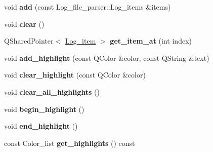 \begin{DoxyCompactItemize}
\item 
\hypertarget{class_log__viewer_1_1_log__items__model_a2065c7f09cf2f34bc476c9d549d4d8ba}{void {\bfseries add} (const Log\-\_\-file\-\_\-parser\-::\-Log\-\_\-items \&items)}\label{class_log__viewer_1_1_log__items__model_a2065c7f09cf2f34bc476c9d549d4d8ba}

\item 
\hypertarget{class_log__viewer_1_1_log__items__model_af90dd226e157a6629d669b0d381df5b3}{void {\bfseries clear} ()}\label{class_log__viewer_1_1_log__items__model_af90dd226e157a6629d669b0d381df5b3}

\item 
\hypertarget{class_log__viewer_1_1_log__items__model_a19c2785185c97acf5d2d94e7884656b2}{Q\-Shared\-Pointer$<$ \hyperlink{class_log__viewer_1_1_log__item}{Log\-\_\-item} $>$ {\bfseries get\-\_\-item\-\_\-at} (int index)}\label{class_log__viewer_1_1_log__items__model_a19c2785185c97acf5d2d94e7884656b2}

\item 
\hypertarget{class_log__viewer_1_1_log__items__model_ab94931c3cae966d04415071da272cfb7}{void {\bfseries add\-\_\-highlight} (const Q\-Color \&color, const Q\-String \&text)}\label{class_log__viewer_1_1_log__items__model_ab94931c3cae966d04415071da272cfb7}

\item 
\hypertarget{class_log__viewer_1_1_log__items__model_a5bfe5f0d114e990b1139102860162379}{void {\bfseries clear\-\_\-highlight} (const Q\-Color \&color)}\label{class_log__viewer_1_1_log__items__model_a5bfe5f0d114e990b1139102860162379}

\item 
\hypertarget{class_log__viewer_1_1_log__items__model_ab79792cd16b66ef42b644b0660c94e3e}{void {\bfseries clear\-\_\-all\-\_\-highlights} ()}\label{class_log__viewer_1_1_log__items__model_ab79792cd16b66ef42b644b0660c94e3e}

\item 
\hypertarget{class_log__viewer_1_1_log__items__model_ac4abf3f20d17ade1eec7b63b5b38ae38}{void {\bfseries begin\-\_\-highlight} ()}\label{class_log__viewer_1_1_log__items__model_ac4abf3f20d17ade1eec7b63b5b38ae38}

\item 
\hypertarget{class_log__viewer_1_1_log__items__model_a175e6ed971ea20ae342d1c53cdfed7e6}{void {\bfseries end\-\_\-highlight} ()}\label{class_log__viewer_1_1_log__items__model_a175e6ed971ea20ae342d1c53cdfed7e6}

\item 
\hypertarget{class_log__viewer_1_1_log__items__model_aec79939e6844d655e2444b4495fd4483}{const Color\-\_\-list {\bfseries get\-\_\-highlights} () const }\label{class_log__viewer_1_1_log__items__model_aec79939e6844d655e2444b4495fd4483}


\end{DoxyCompactItemize}
